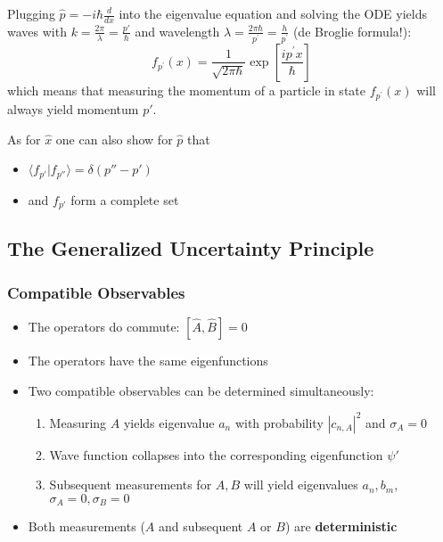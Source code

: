 
Plugging $\hat{p}=-i\hbar \frac{d}{dx}$ into the eigenvalue equation and solving the ODE yields waves with
$k=\frac{2 \pi}{\lambda}=\frac{p'}{\hbar}$ and wavelength $\lambda=\frac{2\pi\hbar}{p^{\prime}}=\frac{h}{p^{\prime}}$
(de Broglie formula!):
\begin{equation*}
    f_{p^{\prime}}(x)=\frac{1}{\sqrt{2\pi\hbar}}\exp\left[\frac{ip^{\prime}x}{\hbar}\right]
\end{equation*}
which means that measuring the momentum of a particle in state $f_{p^{\prime}}(x)$ will always yield momentum $p'$.


As for $\hat{x}$ one can also show for $\hat{p}$ that
\begin{itemize}
    \item $\langle f_{p'}|f_{p''}\rangle=\delta(p''-p')$
    \item and $f_{p'}$ form a complete set
\end{itemize}


\subsection{The Generalized Uncertainty Principle}

\subsubsection{Compatible Observables}

\begin{itemize}
    \item The operators do commute: $[\widehat{A}, \widehat{B}] = 0$
    \item The operators have the same eigenfunctions
    \item Two compatible observables can be determined simultaneously:
          \begin{enumerate}
              \item Measuring $A$ yields eigenvalue $a_n$ with probability $|c_{n,A}|^2$ and $\sigma_A=0$
              \item Wave function collapses into the corresponding eigenfunction $\psi'$
              \item Subsequent measurements for $A,B$ will yield eigenvalues $a_n, b_m$, $\sigma_A=0, \sigma_B=0$
          \end{enumerate}
    \item Both measurements ($A$ and subsequent $A$ or $B$) are \textbf{deterministic}
\end{itemize}

